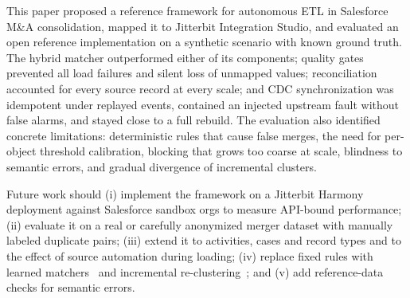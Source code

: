 This paper proposed a reference framework for autonomous ETL in Salesforce M\&A consolidation, mapped it to Jitterbit Integration Studio, and evaluated an open reference implementation on a synthetic scenario with known ground truth. The hybrid matcher outperformed either of its components; quality gates prevented all load failures and silent loss of unmapped values; reconciliation accounted for every source record at every scale; and CDC synchronization was idempotent under replayed events, contained an injected upstream fault without false alarms, and stayed close to a full rebuild. The evaluation also identified concrete limitations: deterministic rules that cause false merges, the need for per-object threshold calibration, blocking that grows too coarse at scale, blindness to semantic errors, and gradual divergence of incremental clusters.

Future work should (i) implement the framework on a Jitterbit Harmony deployment against Salesforce sandbox orgs to measure API-bound performance; (ii) evaluate it on a real or carefully anonymized merger dataset with manually labeled duplicate pairs; (iii) extend it to activities, cases and record types and to the effect of source automation during loading; (iv) replace fixed rules with learned matchers~\cite{mudgal2018} and incremental re-clustering~\cite{gruenheid2014}; and (v) add reference-data checks for semantic errors.
